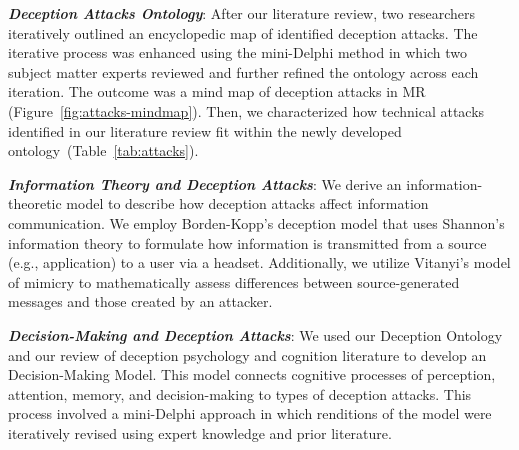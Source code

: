 \emph{\textbf{\MR Deception Attacks Ontology}}: After our literature review, two researchers iteratively outlined an encyclopedic map of identified deception attacks. The iterative process was enhanced using the mini-Delphi method \cite{dalkey1963experimental, pan1996mini} in which two subject matter experts reviewed and further refined the ontology across each iteration. The outcome was a mind map of deception attacks in \ac{MR} (Figure~\ref{fig:attacks-mindmap}).
Then, we characterized how technical attacks identified in our literature review fit within the newly developed ontology~(Table~\ref{tab:attacks}).

\emph{\textbf{Information Theory and Deception Attacks}}: We derive an information-theoretic model to describe how \MR deception attacks affect information communication. We employ Borden-Kopp's deception model \cite{kopp:2018} that uses Shannon's information theory \cite{shannon1948mathematical} to formulate how information is transmitted from a source (e.g., \MR application) to a user via a \MR headset. Additionally, we utilize Vitanyi's model of mimicry \cite{Vitanyi} to mathematically assess differences between source-generated messages and those created by an attacker. %


 \emph{\textbf{Decision-Making and Deception Attacks}}: We used our \MR Deception Ontology and our review of deception psychology and cognition literature to develop an \MR Decision-Making Model. This model connects cognitive processes of perception, attention, memory, and decision-making to types of deception attacks. This process involved a mini-Delphi approach in which renditions of the model were iteratively revised using expert knowledge and prior literature. 

